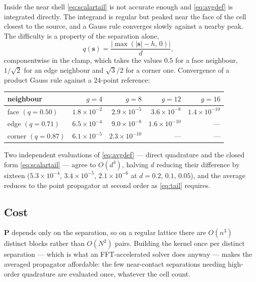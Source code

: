 \documentclass[11pt,a4paper]{article}
\newcommand{\bP}{\mathbf{P}}
\newcommand{\bs}{\mathbf{s}}
\begin{document}
Inside the near shell \eqref{eq:scalartail} is not accurate enough and
\eqref{eq:avgdef} is integrated directly.  The integrand is regular but peaked
near the face of the cell closest to the source, and a Gauss rule converges
slowly against a nearby peak.  The difficulty is a property of the separation
alone,
\begin{equation}\label{eq:qparam}
  q(\bs) = \frac{\big|\max(|\bs|-h,\,0)\big|}{d},
\end{equation}
componentwise in the clamp, which takes the values $0.5$ for a face neighbour,
$1/\sqrt2$ for an edge neighbour and $\sqrt3/2$ for a corner one.  Convergence
of a product Gauss rule against a $24$-point reference:

\begin{center}
\begin{tabular}{@{}lrrrr@{}}
\toprule
neighbour & $g=4$ & $g=8$ & $g=12$ & $g=16$\\
\midrule
face $(q=0.50)$   & $1.8\times10^{-2}$ & $2.9\times10^{-5}$ & $3.6\times10^{-8}$ & $1.4\times10^{-10}$\\
edge $(q=0.71)$   & $6.5\times10^{-4}$ & $9.0\times10^{-8}$ & $1.6\times10^{-10}$ & ---\\
corner $(q=0.87)$ & $6.1\times10^{-5}$ & $2.3\times10^{-10}$ & --- & ---\\
\bottomrule
\end{tabular}
\end{center}

\noindent
Two independent evaluations of \eqref{eq:avgdef} --- direct quadrature and the
closed form \eqref{eq:scalartail} --- agree to $O(d^4)$, halving $d$ reducing
their difference by sixteen ($5.3\times10^{-4}$, $3.4\times10^{-5}$,
$2.1\times10^{-6}$ at $d = 0.2,\,0.1,\,0.05$), and the average reduces to the
point propagator at second order as \eqref{eq:tail} requires.

\subsection{Cost}

$\bP$ depends only on the separation, so on a regular lattice there are
$O(n^3)$ distinct blocks rather than $O(N^2)$ pairs.  Building the kernel once
per distinct separation --- which is what an FFT-accelerated solver does
anyway --- makes the averaged propagator affordable: the few near-contact
separations needing high-order quadrature are evaluated once, whatever the cell
count.
\end{document}
